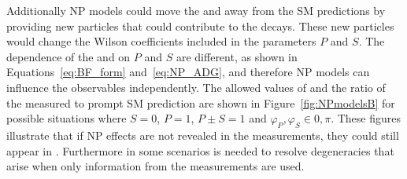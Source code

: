 Additionally NP models could move the \BFs and \ADG away from the SM predictions by providing new particles that could contribute to the decays. These new particles would change the Wilson coefficients included in the parameters $P$ and $S$. The dependence of the \BFs and \ADG on $P$ and $S$ are different, as shown in Equations~\ref{eq:BF_form} and~\ref{eq:NP_ADG}, and therefore NP models can influence the observables independently. The allowed values of \ADG and the ratio of the measured \BF to prompt SM prediction are shown in Figure~\ref{fig:NPmodelsB} for possible situations where $S=0$, $P=1$, $P\pm S = 1$ and $\varphi_P, \varphi_S \in {0, \pi}$. These figures illustrate that if NP effects are not revealed in the \BF measurements, they could still appear in \ADG. Furthermore in some scenarios \ADG is needed to resolve degeneracies that arise when only information from the \BF measurements are used.
